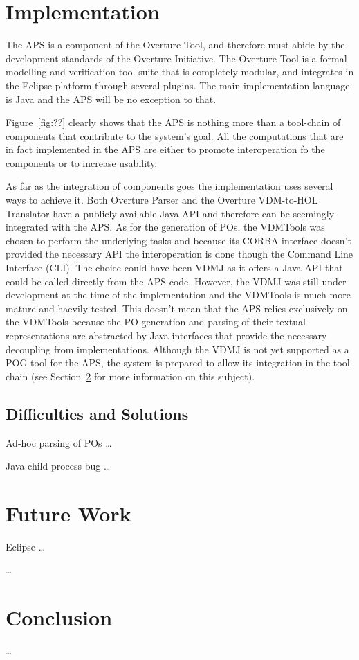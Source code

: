 \documentclass[]{article}
\begin{document}
\section{Implementation}
\label{sec:implementation}

The APS is a component of the Overture Tool, and therefore must abide by the development standards of the Overture Initiative.
The Overture Tool is a formal modelling and verification tool suite that is completely modular, and integrates in the Eclipse platform through several plugins.
The main implementation language is Java and the APS will be no exception to that.

Figure~\ref{fig:??} clearly shows that the APS is nothing more than a tool-chain of components that contribute to the system's goal.
All the computations that are in fact implemented in the APS are either to promote interoperation fo the components or to increase usability.

As far as the integration of components goes the implementation uses several ways to achieve it.
Both Overture Parser and the Overture VDM-to-HOL Translator have a publicly available Java API and therefore can be seemingly integrated with the APS.
As for the generation of POs, the VDMTools was chosen to perform the underlying tasks and because its CORBA interface doesn't provided the necessary API the interoperation is done though the Command Line Interface (CLI).
The choice could have been VDMJ as it offers a Java API that could be called directly from the APS code.
However, the VDMJ was still under development at the time of the implementation and the VDMTools is much more mature and haevily tested.
This doesn't mean that the APS relies exclusively on the VDMTools because the PO generation and parsing of their textual representations are abstracted by Java interfaces that provide the necessary decoupling from implementations.
Although the VDMJ is not yet supported as a POG tool for the APS, the system is prepared to allow its integration in the tool-chain (see Section~\ref{sec:future_work} for more information on this subject).



\subsection{Difficulties and Solutions}
\label{sub:implementation_difficulties}

Ad-hoc parsing of POs \ldots

Java child process bug \ldots

\section{Future Work}
\label{sec:future_work}

Eclipse \ldots

\ldots

\section{Conclusion}
\label{sec:conclusion}

\ldots
\end{document}
